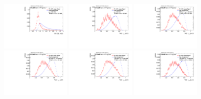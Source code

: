 \begin{figure}[H]
\includegraphics[width=0.3\textwidth]{sascha_input/Appendix/Distributions/w/distributions/beta05/h_assisted_tj_D2_05_bin6.pdf}
\bigskip 
\includegraphics[width=0.3\textwidth]{sascha_input/Appendix/Distributions/w/distributions/beta05/h_assisted_tj_nSub21_05_bin1.pdf} \hspace{1mm}
\includegraphics[width=0.3\textwidth]{sascha_input/Appendix/Distributions/w/distributions/beta05/h_assisted_tj_nSub21_05_bin2.pdf} \hspace{1mm}
\includegraphics[width=0.3\textwidth]{sascha_input/Appendix/Distributions/w/distributions/beta05/h_assisted_tj_nSub21_05_bin3.pdf} 
\bigskip
\includegraphics[width=0.3\textwidth]{sascha_input/Appendix/Distributions/w/distributions/beta05/h_assisted_tj_nSub21_05_bin4.pdf} \hspace{6mm}
\includegraphics[width=0.3\textwidth]{sascha_input/Appendix/Distributions/w/distributions/beta05/h_assisted_tj_nSub21_05_bin5.pdf} \hspace{6mm}

\end{figure}
